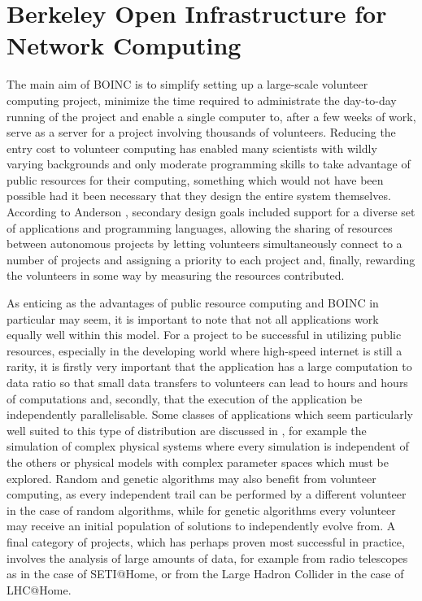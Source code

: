 \section{Berkeley Open Infrastructure for Network Computing} \label{Boincgen}
The main aim of BOINC is to simplify setting up a large-scale volunteer computing project, minimize the time required to administrate the day-to-day running of the project and enable a single computer to, after a few weeks of work, serve as a server for a project involving thousands of volunteers. Reducing the entry cost to volunteer computing has enabled many scientists with wildly varying backgrounds and only moderate programming skills to take advantage of public resources for their computing, something which would not have been possible had it been necessary that they design the entire system themselves. According to Anderson \cite{anderson2004boinc},  secondary design goals included support for a diverse set of applications and programming languages, allowing the sharing of resources between autonomous projects by letting volunteers simultaneously connect to a number of projects and assigning a priority to each project   and, finally, rewarding the volunteers in some way by measuring the resources contributed.


As enticing as  the advantages of public resource computing and BOINC in particular may seem, it is important to note that not all applications   work equally well within this model. For a project to be successful in  utilizing public resources, especially in the developing world where high-speed internet is still a rarity,  it is firstly  very important that the application  has a large computation to data ratio so that small data transfers to volunteers can lead to hours and hours of computations and, secondly, that the execution of the application be independently parallelisable. Some classes of applications which seem particularly well suited to this type of distribution are discussed in \cite{anderson:pc}, for example the simulation of complex physical systems  where every simulation is independent of the others  or physical models with complex parameter spaces which must be explored. Random and genetic algorithms may also benefit from volunteer computing, as every independent trail can be performed by a different volunteer in the case of random algorithms, while for genetic algorithms every volunteer may receive an initial population of solutions to independently evolve from. A final category of projects, which has perhaps proven most successful in practice, involves the analysis of large amounts of data, for example from radio telescopes as in the case of SETI@Home, or  from the Large Hadron Collider in the case of LHC@Home.

